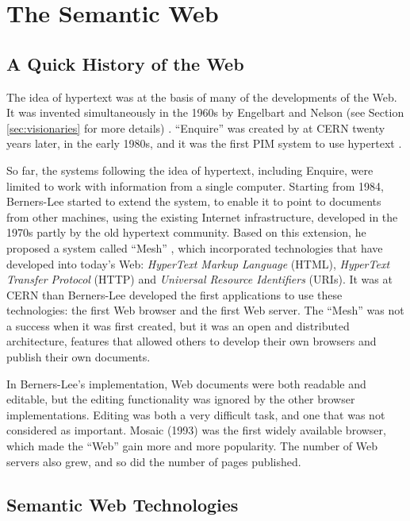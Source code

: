 \section{The Semantic Web}
\label{sec:semweb}

\subsection{A Quick History of the Web}

The idea of hypertext was at the basis of many of the developments of the Web. It was invented simultaneously in the 1960s by Engelbart and Nelson (see Section \ref{sec:visionaries} for more details) \cite{Engelbart1962,Engelbart1968,Nelson1965}. ``Enquire'' was created by \cite{BernersLee2000} at CERN twenty years later, in the early 1980s, and it was the first PIM system to use hypertext .

So far, the systems following the idea of hypertext, including Enquire, were limited to work with information from a single computer. Starting from 1984, Berners-Lee started to extend the system, to enable it to point to documents from other machines, using the existing Internet infrastructure, developed in the 1970s partly by the old hypertext community. Based on this extension, he proposed a system called ``Mesh'' \cite{BernersLee1989}, which incorporated technologies that have developed into today's Web: \emph{HyperText Markup Language} (HTML), \emph{HyperText Transfer Protocol} (HTTP) and \emph{Universal Resource Identifiers} (URIs). It was at CERN than Berners-Lee developed the first applications to use these technologies: the first Web browser and the first Web server. The ``Mesh'' was not a success when it was first created, but it was an open and distributed architecture, features that allowed others to develop their own browsers and publish their own documents. 

In Berners-Lee's implementation, Web documents were both readable and editable, but the editing functionality was ignored by the other browser implementations. Editing was both a very difficult task, and one that was not considered as important. Mosaic (1993) was the first widely available browser, which made the ``Web'' gain more and more popularity. The number of Web servers also grew, and so did the number of pages published.

\subsection{Semantic Web Technologies}

